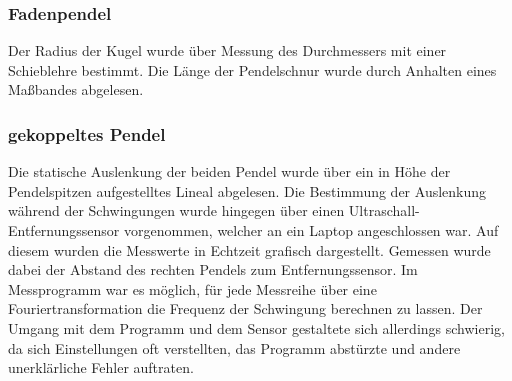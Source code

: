 \subsubsection{Fadenpendel}
Der Radius der Kugel wurde über Messung des Durchmessers mit einer Schieblehre bestimmt. Die Länge der Pendelschnur wurde durch Anhalten eines Maßbandes abgelesen.
\subsubsection{gekoppeltes Pendel}
\label{messgekop}
Die statische Auslenkung der beiden Pendel wurde über ein in Höhe der Pendelspitzen aufgestelltes Lineal abgelesen. Die Bestimmung der Auslenkung während der Schwingungen wurde hingegen über einen Ultraschall-Entfernungssensor vorgenommen, welcher an ein Laptop angeschlossen war. Auf diesem wurden die Messwerte in Echtzeit grafisch dargestellt. Gemessen wurde dabei der Abstand des rechten Pendels zum Entfernungssensor. Im Messprogramm war es möglich, für jede Messreihe über eine Fouriertransformation  die Frequenz der Schwingung berechnen zu lassen. Der Umgang mit dem Programm und dem Sensor gestaltete sich allerdings schwierig, da sich Einstellungen oft verstellten, das Programm abstürzte und andere unerklärliche Fehler auftraten.